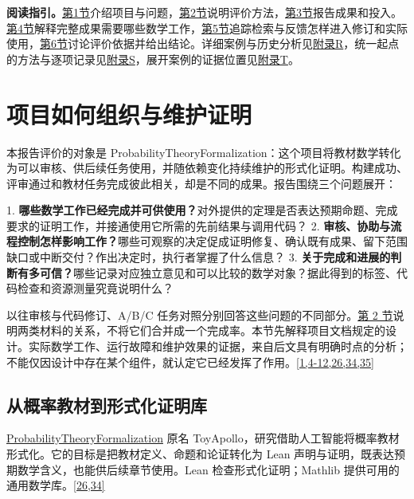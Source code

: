 \textbf{阅读指引。}\hyperlink{section-1}{第1节}介绍项目与问题，\hyperlink{section-2}{第2节}说明评价方法，\hyperlink{section-3}{第3节}报告成果和投入。\hyperlink{section-4}{第4节}解释完整成果需要哪些数学工作，\hyperlink{section-5}{第5节}追踪检索与反馈怎样进入修订和实际使用，\hyperlink{section-6}{第6节}讨论评价依据并给出结论。详细案例与历史分析见\href{zh-appendix.pdf\#appendix-r}{附录R}，统一起点的方法与逐项记录见\href{zh-appendix.pdf\#appendix-s}{附录S}，展开案例的证据位置见\href{zh-appendix.pdf\#appendix-t}{附录T}。

\section[项目如何组织与维护证明]{\texorpdfstring{\protect\hypertarget{section-1}{}项目如何组织与维护证明}{项目如何组织与维护证明}}
\hypertarget{evaluation-questions}{}

本报告评价的对象是 ProbabilityTheoryFormalization：这个项目将教材数学转化为可以审核、供后续任务使用，并随依赖变化持续维护的形式化证明。构建成功、评审通过和教材任务完成彼此相关，却是不同的成果。报告围绕三个问题展开：

1. \textbf{哪些数学工作已经完成并可供使用？}对外提供的定理是否表达预期命题、完成要求的证明工作，并接通使用它所需的先前结果与调用代码？ 2. \textbf{审核、协助与流程控制怎样影响工作？}哪些可观察的决定促成证明修复、确认既有成果、留下范围缺口或中断交付？作出决定时，执行者掌握了什么信息？ 3. \textbf{关于完成和进展的判断有多可信？}哪些记录对应独立意见和可以比较的数学对象？据此得到的标签、代码检查和资源测量究竟说明什么？

以往审核与代码修订、A/B/C 任务对照分别回答这些问题的不同部分。\hyperlink{section-2}{第 2 节}说明两类材料的关系，不将它们合并成一个完成率。本节先解释项目文档规定的设计。实际数学工作、运行故障和维护效果的证据，来自后文具有明确时点的分析；不能仅因设计中存在某个组件，就认定它已经发挥了作用。\hyperlink{ref-1}{\mbox{[1,4-12,26,34,35]}}

\subsection[从概率教材到形式化证明库]{\texorpdfstring{\protect\hypertarget{section-1-1}{}从概率教材到形式化证明库}{从概率教材到形式化证明库}}
\href{https://github.com/Kind-NK-Hill/ProbabilityTheoryFormalization}{ProbabilityTheoryFormalization} 原名 ToyApollo，研究借助人工智能将概率教材形式化。它的目标是把教材定义、命题和论证转化为 Lean 声明与证明，既表达预期数学含义，也能供后续章节使用。Lean 检查形式化证明；Mathlib 提供可用的通用数学库。\hyperlink{ref-26}{\mbox{[26,34]}}

